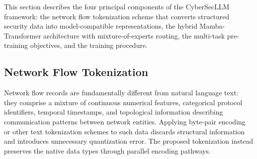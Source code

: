 \documentclass[journal]{IEEEtran}
\newcommand{\modelname}{CyberSecLLM}
\begin{document}
This section describes the four principal components of the \modelname{} framework: the network flow tokenization scheme that converts structured security data into model-compatible representations, the hybrid Mamba-Transformer architecture with mixture-of-experts routing, the multi-task pre-training objectives, and the training procedure.

\subsection{Network Flow Tokenization}
\label{subsec:tokenization}

Network flow records are fundamentally different from natural language text: they comprise a mixture of continuous numerical features, categorical protocol identifiers, temporal timestamps, and topological information describing communication patterns between network entities. Applying byte-pair encoding or other text tokenization schemes to such data discards structural information and introduces unnecessary quantization error. The proposed tokenization instead preserves the native data types through parallel encoding pathways.
\end{document}
